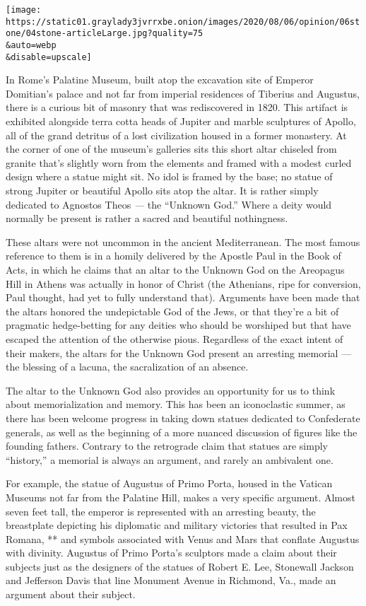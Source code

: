 \texttt{[image: https://static01.graylady3jvrrxbe.onion/images/2020/08/06/opinion/06stone/04stone-articleLarge.jpg?quality=75\\\&auto=webp\\\&disable=upscale]}

In Rome's Palatine Museum, built atop the excavation site of Emperor
Domitian's palace and not far from imperial residences of Tiberius and
Augustus, there is a curious bit of masonry that was rediscovered in
1820. This artifact is exhibited alongside terra cotta heads of Jupiter
and marble sculptures of Apollo, all of the grand detritus of a lost
civilization housed in a former monastery. At the corner of one of the
museum's galleries sits this short altar chiseled from granite that's
slightly worn from the elements and framed with a modest curled design
where a statue might sit. No idol is framed by the base; no statue of
strong Jupiter or beautiful Apollo sits atop the altar. It is rather
simply dedicated to Agnostos Theos \emph{---} the ``Unknown God.'' Where
a deity would normally be present is rather a sacred and beautiful
nothingness.

These altars were not uncommon in the ancient Mediterranean. The most
famous reference to them is in a homily delivered by the Apostle Paul in
the Book of Acts, in which he claims that an altar to the Unknown God on
the Areopagus Hill in Athens was actually in honor of Christ (the
Athenians, ripe for conversion, Paul thought, had yet to fully
understand that). Arguments have been made that the altars honored the
undepictable God of the Jews, or that they're a bit of pragmatic
hedge-betting for any deities who should be worshiped but that have
escaped the attention of the otherwise pious. Regardless of the exact
intent of their makers, the altars for the Unknown God present an
arresting memorial --- the blessing of a lacuna, the sacralization of an
absence.

The altar to the Unknown God also provides an opportunity for us to
think about memorialization and memory. This has been an iconoclastic
summer, as there has been welcome progress in taking down statues
dedicated to Confederate generals, as well as the beginning of a more
nuanced discussion of figures like the founding fathers. Contrary to the
retrograde claim that statues are simply ``history,'' a memorial is
always an argument, and rarely an ambivalent one.

For example, the statue of Augustus of Primo Porta, housed in the
Vatican Museums not far from the Palatine Hill, makes a very specific
argument. Almost seven feet tall, the emperor is represented with an
arresting beauty, the breastplate depicting his diplomatic and military
victories that resulted in Pax Romana, ** and symbols associated with
Venus and Mars that conflate Augustus with divinity. Augustus of Primo
Porta's sculptors made a claim about their subjects just as the
designers of the statues of Robert E. Lee, Stonewall Jackson and
Jefferson Davis that line Monument Avenue in Richmond, Va., made an
argument about their subject.

